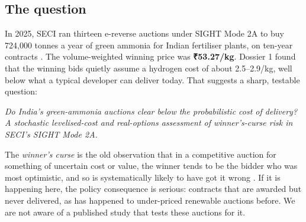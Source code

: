 \label{sec:paper}

\subsection{The question}
In 2025, SECI ran thirteen e-reverse auctions under SIGHT Mode 2A to buy 724,000 tonnes a year of green ammonia for Indian fertiliser plants, on ten-year contracts \cite{seci2025}. The volume-weighted winning price was \textbf{₹53.27/kg}. Dossier 1 found that the winning bids quietly assume a hydrogen cost of about \usd{}2.5--2.9/kg, well below what a typical developer can deliver today. That suggests a sharp, testable question:

\begin{center}
\begin{minipage}{0.9\textwidth}\centering
\display\itshape\fontsize{12.5}{16}\selectfont\color{ink}
Do India's green-ammonia auctions clear below the probabilistic cost of delivery? A stochastic levelised-cost and real-options assessment of winner's-curse risk in SECI's SIGHT Mode 2A.
\end{minipage}
\end{center}

\noindent The \emph{winner's curse} is the old observation that in a competitive auction for something of uncertain cost or value, the winner tends to be the bidder who was most optimistic, and so is systematically likely to have got it wrong \cite{capen1971,thaler1988}. If it is happening here, the policy consequence is serious: contracts that are awarded but never delivered, as has happened to under-priced renewable auctions before. We are not aware of a published study that tests these auctions for it. \confM

